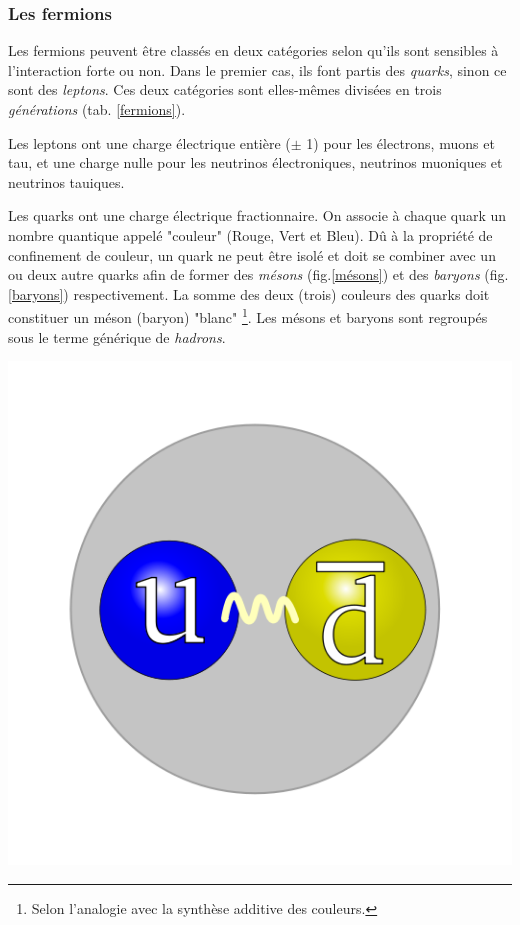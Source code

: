 \subsubsection{Les fermions}
Les fermions peuvent être classés en deux catégories selon qu'ils sont sensibles à l'interaction forte ou non. Dans le premier cas, ils font partis des \textit{quarks}, sinon ce sont des \textit{leptons}. Ces deux catégories sont elles-mêmes divisées en trois \textit{générations} (tab. \ref{fermions}).

Les leptons ont une charge électrique entière ($\pm$ 1) pour les électrons, muons et tau, et une charge nulle pour les neutrinos électroniques, neutrinos muoniques et neutrinos tauiques.

Les quarks ont une charge électrique fractionnaire. On associe à chaque quark un nombre quantique appelé "couleur" (Rouge, Vert et Bleu). Dû à la propriété de confinement de couleur, un quark ne peut être isolé et doit se combiner avec un ou deux autre quarks afin de former des \textit{mésons} (fig.\ref{mésons}) et des \textit{baryons} (fig.\ref{baryons}) respectivement. La somme des deux (trois) couleurs des quarks doit constituer un méson (baryon) "blanc" \footnote{Selon l'analogie avec la synthèse additive des couleurs.}. Les mésons et baryons sont regroupés sous le terme générique de \textit{hadrons}.

\marginpar
{
\centering
\includegraphics[width=\marginparwidth]{SM/quarks2.png}
\label{mésons}
}

